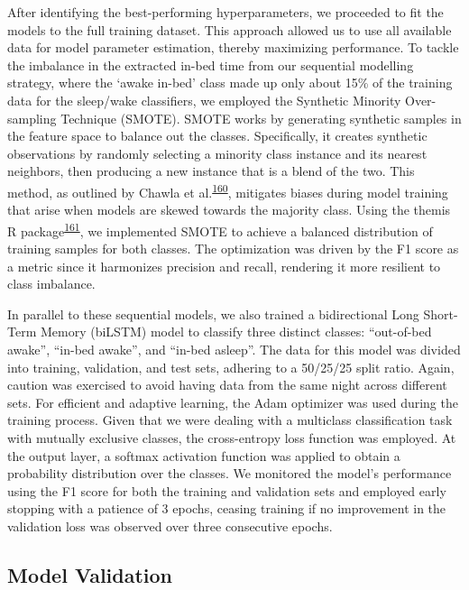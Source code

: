 \documentclass[
  10pt,
]{scrbook}
\begin{document}
After identifying the best-performing hyperparameters, we proceeded to
fit the models to the full training dataset. This approach allowed us to
use all available data for model parameter estimation, thereby
maximizing performance. To tackle the imbalance in the extracted in-bed
time from our sequential modelling strategy, where the `awake in-bed'
class made up only about 15\% of the training data for the sleep/wake
classifiers, we employed the Synthetic Minority Over-sampling Technique
(SMOTE). SMOTE works by generating synthetic samples in the feature
space to balance out the classes. Specifically, it creates synthetic
observations by randomly selecting a minority class instance and its
nearest neighbors, then producing a new instance that is a blend of the
two. This method, as outlined by Chawla et
al.\textsuperscript{\protect\hyperlink{ref-chawla_smote_2002}{160}},
mitigates biases during model training that arise when models are skewed
towards the majority class. Using the themis R
package\textsuperscript{\protect\hyperlink{ref-themis}{161}}, we
implemented SMOTE to achieve a balanced distribution of training samples
for both classes. The optimization was driven by the F1 score as a
metric since it harmonizes precision and recall, rendering it more
resilient to class imbalance.

In parallel to these sequential models, we also trained a bidirectional
Long Short-Term Memory (biLSTM) model to classify three distinct
classes: ``out-of-bed awake'', ``in-bed awake'', and ``in-bed asleep''.
The data for this model was divided into training, validation, and test
sets, adhering to a 50/25/25 split ratio. Again, caution was exercised
to avoid having data from the same night across different sets. For
efficient and adaptive learning, the Adam optimizer was used during the
training process. Given that we were dealing with a multiclass
classification task with mutually exclusive classes, the cross-entropy
loss function was employed. At the output layer, a softmax activation
function was applied to obtain a probability distribution over the
classes. We monitored the model's performance using the F1 score for
both the training and validation sets and employed early stopping with a
patience of 3 epochs, ceasing training if no improvement in the
validation loss was observed over three consecutive epochs.

\hypertarget{model-validation}{%
\subsection{Model Validation}\label{model-validation}}
\end{document}
